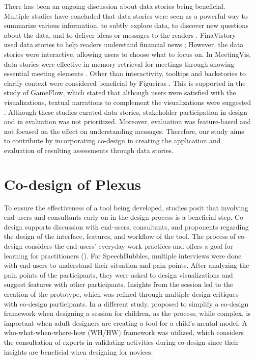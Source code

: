 \documentclass{sigchi}
\begin{document}
There has been an ongoing discussion about data stories being beneficial. Multiple studies have concluded that data stories were seen as a powerful way to summarize various information, to subtly explore data, to discover new questions about the data, and to deliver ideas or messages to the readers \cite{Pavel2013} \cite{Layton2014}. FinaVistory used data stories to help readers understand financial news \cite{Chan2016}; However, the data stories were interactive, allowing users to choose what to focus on. In MeetingVis, data stories were effective in memory retrieval for meetings through showing essential meeting elements \cite{Shi2018}. Other than interactivity, tooltips and backstories to clarify context were considered beneficial by Figueiras \cite{Figueiras2014}. This is supported in the study of GameFlow, which stated that although users were satisfied with the visualizations, textual narrations to complement the visualizations were suggested \cite{Chen2016}. Although these studies curated data stories, stakeholder participation in design and in evaluation was not prioritized. Moreover, evaluation was feature-based and not focused on the effect on understanding messages. Therefore, our study aims to contribute by incorporating co-design in creating the application and evaluation of resulting assessments through data stories. 

\section{Co-design of Plexus}

To ensure the effectiveness of a tool being developed, studies posit that involving end-users and consultants early on in the design process is a beneficial step. Co-design supports discussion with end-users, consultants, and  proponents regarding the design of the interface, features, and workflow of the tool. The process of co-design considers the end-users' everyday work practices and offers a goal for learning for practitioners  (\cite{roschelle:2006}). For SpeechBubbles, multiple interviews were done with end-users to understand their situation and pain points. After analyzing the pain points of the participants, they were asked to design visualizations and suggest features with other participants. Insights from the session led to the creation of the prototype, which was refined through multiple design critiques with co-design participants. In a different study, \cite{mazzone:2011}  proposed to simplify a co-design framework when designing a session for children, as the process, while complex, is important when adult designers are creating a tool for a child's mental model.  A who-what-when-where-how (WH/HW) framework was utilized, which considers the consultation of experts in validating activities during co-design since their insights are beneficial when designing for novices.
\end{document}
